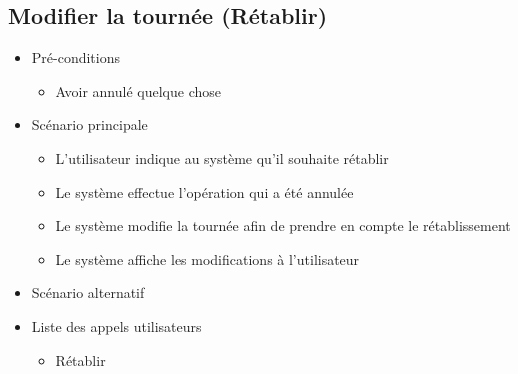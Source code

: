 \documentclass[10pt,a4paper]{book}
\begin{document}
\subsection{Modifier la tournée (Rétablir)}
\begin{itemize}
	\item{Pré-conditions}
		\begin{itemize}
		\item{Avoir annulé quelque chose}
	\end{itemize}
	\item{Scénario principale}
	\begin{itemize}
		\item{L’utilisateur indique au système qu’il souhaite rétablir}
		\item{Le système effectue l’opération qui a été annulée}
		\item{Le système modifie la tournée afin de prendre en compte le rétablissement}
		\item{Le système affiche les modifications à l’utilisateur}
	\end{itemize}
	\item{Scénario alternatif}
	\item{Liste des appels utilisateurs}
	\begin{itemize}
		\item{Rétablir}
	\end{itemize}
\end{itemize}
\end{document}

